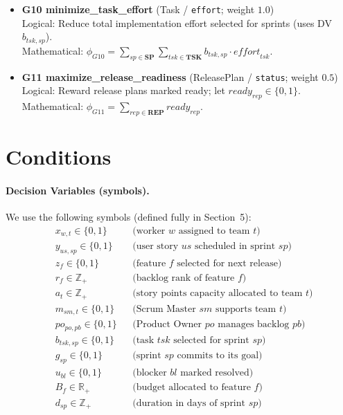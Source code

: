 \documentclass[11pt,a4paper]{article}
\begin{document}
\begin{itemize}[leftmargin=2em,itemsep=0.5em]
  \item \textbf{G10 minimize\_task\_effort} (Task / \texttt{effort}; weight $1.0$)\\
  Logical: Reduce total implementation effort selected for sprints (uses DV $b_{tsk,sp}$).\\
  Mathematical: $\displaystyle \phi_{G10} = \sum_{sp \in \mathbf{SP}} \sum_{tsk \in \mathbf{TSK}} b_{tsk,sp}\cdot \textit{effort}_{tsk}$.

  \item \textbf{G11 maximize\_release\_readiness} (ReleasePlan / \texttt{status}; weight $0.5$)\\
  Logical: Reward release plans marked ready; let $\textit{ready}_{rep}\in\{0,1\}$.\\
  Mathematical: $\displaystyle \phi_{G11} = \sum_{rep \in \mathbf{REP}} \textit{ready}_{rep}$.
\end{itemize}

\section{Conditions}
\paragraph{Decision Variables (symbols).} We use the following symbols (defined fully in Section~5):
\[
\begin{aligned}
&x_{w,t}\in\{0,1\} &&\text{(worker $w$ assigned to team $t$)}\\
&y_{us,sp}\in\{0,1\} &&\text{(user story $us$ scheduled in sprint $sp$)}\\
&z_{f}\in\{0,1\} &&\text{(feature $f$ selected for next release)}\\
&r_f\in\mathbb{Z}_+ &&\text{(backlog rank of feature $f$)}\\
&a_t\in\mathbb{Z}_+ &&\text{(story points capacity allocated to team $t$)}\\
&m_{sm,t}\in\{0,1\} &&\text{(Scrum Master $sm$ supports team $t$)}\\
&po_{po,pb}\in\{0,1\} &&\text{(Product Owner $po$ manages backlog $pb$)}\\
&b_{tsk,sp}\in\{0,1\} &&\text{(task $tsk$ selected for sprint $sp$)}\\
&g_{sp}\in\{0,1\} &&\text{(sprint $sp$ commits to its goal)}\\
&u_{bl}\in\{0,1\} &&\text{(blocker $bl$ marked resolved)}\\
&B_f\in\mathbb{R}_+ &&\text{(budget allocated to feature $f$)}\\
&d_{sp}\in\mathbb{Z}_+ &&\text{(duration in days of sprint $sp$)}\\
\end{aligned}
\]
\end{document}
